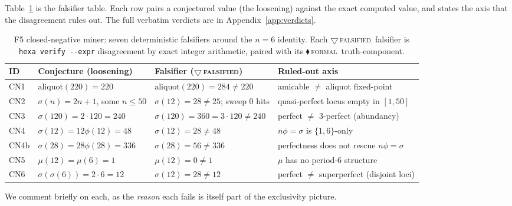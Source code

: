\documentclass[11pt,a4paper]{article}
\newcommand{\sig}{\sigma}
\newcommand{\tierF}{\textcolor{blue!60!black}{$\blacklozenge$}\,\textsc{formal}}
\newcommand{\tierR}{\textcolor{red!70!black}{$\bigtriangledown$}\,\textsc{falsified}}
\theoremstyle{definition}
\begin{document}
Table~\ref{tab:f5} is the falsifier table. Each row pairs a conjectured value
(the loosening) against the exact computed value, and states the axis that the
disagreement rules out. The full verbatim verdicts are in
Appendix~\ref{app:verdicts}.

\begin{table}[h]
\centering
\caption{F5 closed-negative miner: seven deterministic falsifiers around the
$n=6$ identity. Each \tierR\ falsifier is \texttt{hexa verify -{}-expr}
disagreement by exact integer arithmetic, paired with its \tierF\
truth-component.}
\label{tab:f5}
\small
\begin{tabular}{@{}llll@{}}
\toprule
\textbf{ID} & \textbf{Conjecture (loosening)} & \textbf{Falsifier (\tierR)} & \textbf{Ruled-out axis} \\
\midrule
CN1  & $\mathrm{aliquot}(220)=220$ & $\mathrm{aliquot}(220)=284\neq220$ & amicable $\neq$ aliquot fixed-point \\
CN2  & $\sig(n)=2n+1$, some $n\le50$ & $\sig(12)=28\neq25$; sweep $0$ hits & quasi-perfect locus empty in $[1,50]$ \\
CN3  & $\sig(120)=2\cdot120=240$ & $\sig(120)=360=3\cdot120\neq240$ & perfect $\neq$ $3$-perfect (abundancy) \\
CN4  & $\sig(12)=12\phi(12)=48$ & $\sig(12)=28\neq48$ & $n\phi=\sig$ is $\{1,6\}$-only \\
CN4b & $\sig(28)=28\phi(28)=336$ & $\sig(28)=56\neq336$ & perfectness does not rescue $n\phi=\sig$ \\
CN5  & $\mu(12)=\mu(6)=1$ & $\mu(12)=0\neq1$ & $\mu$ has no period-$6$ structure \\
CN6  & $\sig(\sig(6))=2\cdot6=12$ & $\sig(12)=28\neq12$ & perfect $\neq$ superperfect (disjoint loci) \\
\bottomrule
\end{tabular}
\end{table}

We comment briefly on each, as the \emph{reason} each fails is itself part of
the exclusivity picture.
\end{document}
